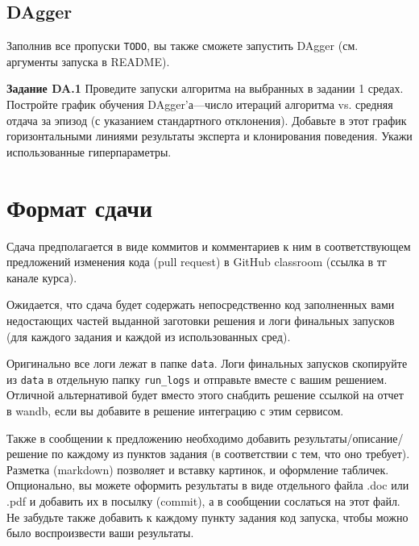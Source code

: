\documentclass[12pt, oneside]{article}
\begin{document}
\subsection{DAgger}

Заполнив все пропуски \verb|TODO|, вы также сможете запустить DAgger (см. аргументы запуска в README).

\textbf{Задание DA.1} Проведите запуски алгоритма на выбранных в задании 1 средах. Постройте график обучения DAgger'а---число итераций алгоритма vs. средняя отдача за эпизод (с указанием стандартного отклонения). Добавьте в этот график горизонтальными линиями результаты эксперта и клонирования поведения. Укажи использованные гиперпараметры.

\section{Формат сдачи}

Сдача предполагается в виде коммитов и комментариев к ним в соответствующем предложений изменения кода (pull request) в GitHub classroom (ссылка в тг канале курса).

Ожидается, что сдача будет содержать непосредственно код заполненных вами недостающих частей выданной заготовки решения и логи финальных запусков (для каждого задания и каждой из использованных сред).

Оригинально все логи лежат в папке \verb|data|. Логи финальных запусков скопируйте из \verb|data| в отдельную папку \verb|run_logs| и отправьте вместе с вашим решением. Отличной альтернативой будет вместо этого снабдить решение ссылкой на отчет в wandb, если вы добавите в решение интеграцию с этим сервисом.

Также в сообщении к предложению необходимо добавить результаты/описание/решение по каждому из пунктов задания (в соответствии с тем, что оно требует). Разметка (markdown) позволяет и вставку картинок, и оформление табличек. Опционально, вы можете оформить результаты в виде отдельного файла .doc или .pdf и добавить их в посылку (commit), а в сообщении сослаться на этот файл. Не забудьте также добавить к каждому пункту задания код запуска, чтобы можно было воспроизвести ваши результаты.
\end{document}
